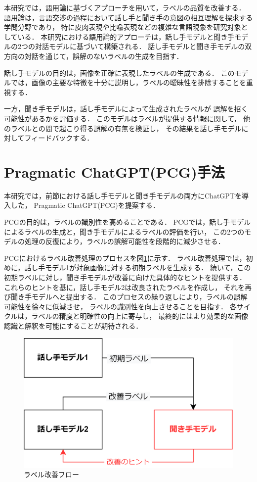 \documentclass[a4paper,11pt]{jreport}
\begin{document}
本研究では，語用論に基づくアプローチを用いて，ラベルの品質を改善する．
語用論は，言語交渉の過程において話し手と聞き手の意図の相互理解を探求する学問分野であり，
特に皮肉表現や比喩表現などの複雑な言語現象を研究対象としている．
本研究における語用論的アプローチは，話し手モデルと聞き手モデルの2つの対話モデルに基づいて構築される．
話し手モデルと聞き手モデルの双方向の対話を通じて，誤解のないラベルの生成を目指す．

話し手モデルの目的は，画像を正確に表現したラベルの生成である．
このモデルでは，画像の主要な特徴を十分に説明し，ラベルの曖昧性を排除することを重視する．

一方，聞き手モデルは，話し手モデルによって生成されたラベルが
誤解を招く可能性があるかを評価する．
このモデルはラベルが提供する情報に関して，
他のラベルとの間で起こり得る誤解の有無を検証し，
その結果を話し手モデルに対してフィードバックする．

\section{Pragmatic ChatGPT(PCG)手法}
本研究では，前節における話し手モデルと聞き手モデルの両方にChatGPTを導入した，
Pragmatic ChatGPT(PCG)を提案する．

PCGの目的は，ラベルの識別性を高めることである．
PCGでは，話し手モデルによるラベルの生成と，聞き手モデルによるラベルの評価を行い，
この2つのモデルの処理の反復により，ラベルの誤解可能性を段階的に減少させる．

PCGにおけるラベル改善処理のプロセスを図\ref{fig:PCGflow}に示す．
ラベル改善処理では，初めに，話し手モデル1が対象画像に対する初期ラベルを生成する．
続いて，この初期ラベルに対し，聞き手モデルが改善に向けた具体的なヒントを提供する．
これらのヒントを基に，話し手モデル2は改良されたラベルを作成し，
それを再び聞き手モデルへと提出する．
このプロセスの繰り返しにより，ラベルの誤解可能性を徐々に低減させ，
ラベルの識別性を向上させることを目指す．
各サイクルは，ラベルの精度と明確性の向上に寄与し，
最終的にはより効果的な画像認識と解釈を可能にすることが期待される．

\begin{figure}[H]
	\centering
	\includegraphics[width=0.8\linewidth]{figures/PCGflow.png}
	\caption{ラベル改善フロー}
	\label{fig:PCGflow}
\end{figure}
\end{document}
